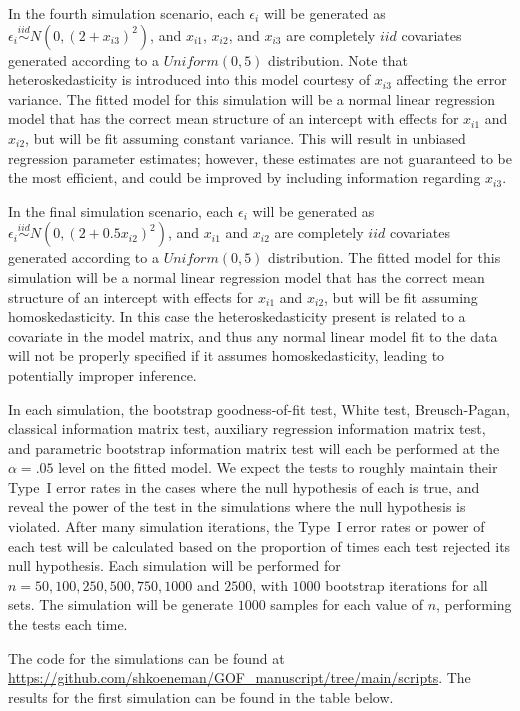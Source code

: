 \documentclass[12pt]{article} %
\theoremstyle{definition}
\begin{document}
In the fourth simulation scenario, each $\epsilon_i$ will be generated as $\epsilon_i \stackrel{iid}{\sim} N \left( 0,(2 + x_{i3})^2 \right)$, and $x_{i1}$, $x_{i2}$, and $x_{i3}$ are completely $iid$ covariates
generated according to a $Uniform(0,5)$ distribution. Note that heteroskedasticity is introduced into this model courtesy of $x_{i3}$ affecting the error variance. The fitted model for
this simulation will be a normal linear regression model that has the correct mean structure of an intercept with effects for $x_{i1}$ and $x_{i2}$, but will be fit assuming constant variance.
This will result in unbiased regression parameter estimates; however, these estimates are not guaranteed to be the most efficient, and could be improved by including information regarding $x_{i3}$.

In the final simulation scenario, each $\epsilon_i$ will be generated as $\epsilon_i \stackrel{iid}{\sim} N \left( 0,(2 + 0.5 x_{i2})^2 \right)$, and $x_{i1}$ and $x_{i2}$ are completely $iid$ covariates generated according to
a $Uniform(0,5)$ distribution. The fitted model for this simulation will be a normal linear regression model that has the correct mean structure of an intercept with effects for $x_{i1}$ and $x_{i2}$,
but will be fit assuming homoskedasticity. In this case the heteroskedasticity present is related to a covariate in the model matrix, and thus any normal linear model fit to the data will not be properly
specified if it assumes homoskedasticity, leading to potentially improper inference.

In each simulation, the bootstrap goodness-of-fit test, White test, Breusch-Pagan, classical information matrix test, auxiliary regression information matrix test, and parametric bootstrap information matrix test will each be performed at the $\alpha = .05$ level on the  fitted model. We expect the tests to roughly maintain their
Type~I error rates in the cases where the null hypothesis of each is true, and reveal the power of the test in the simulations where the null hypothesis is violated. After many simulation iterations, the
Type~I error rates or power of each test will be calculated based on the proportion of times each test rejected its null hypothesis. Each simulation will be performed for $n = 50, 100, 250, 500, 750, 1000$ and $2500$, with $1000$
bootstrap iterations for all sets. The simulation will be generate $1000$ samples for each value of $n$, performing the tests each time.

The code for the simulations can be found at \url{https://github.com/shkoeneman/GOF_manuscript/tree/main/scripts}. The results for the first simulation
can be found in the table below.
\end{document}
